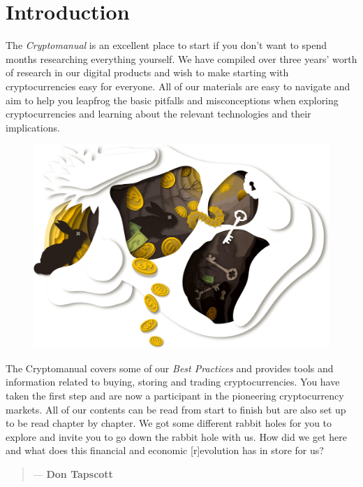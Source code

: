 \chapter*{Introduction}

The \emph{Cryptomanual} is an excellent place to start if you don't want to spend months researching everything yourself. We have compiled over three years' worth of research in our digital products and wish to make starting with cryptocurrencies easy for everyone. All of our materials are easy to navigate and aim to help you leapfrog the basic pitfalls and misconceptions when exploring cryptocurrencies and learning about the relevant technologies and their implications.
\medskip

\begin{figure}[ht!]
    \centering
    \includegraphics[width=\textwidth]{illustrations/resized_CRYPTO_KEY_1_PART_1.jpg}
\end{figure}

The Cryptomanual covers some of our \emph{Best Practices} and provides tools and information related to buying, storing and trading cryptocurrencies. You have taken the first step and are now a participant in the pioneering cryptocurrency markets. All of our contents can be read from start to finish but are also set up to be read chapter by chapter. We got some different rabbit holes for you to explore and invite you to go down the rabbit hole with us. How did we get here and what does this financial and economic [r]evolution has in store for us?

    \begin{quotation}
          \textit{}
          \begin{flushright}
            \small{--- \textbf{Don Tapscott}}
          \end{flushright}
    \end{quotation}
    

